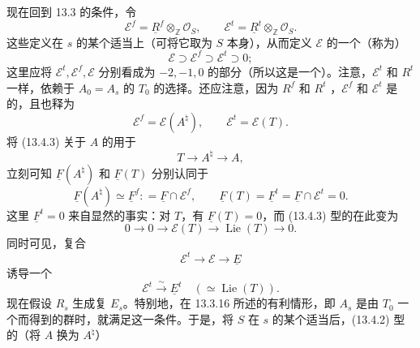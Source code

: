 现在回到 13.3 的条件，令
\begin{equation}
 \mathscr E^f=\underline R^f\otimes_{\mathbb Z}\mathcal O_S,\qquad
 \mathscr E^t=\underline R^t\otimes_{\mathbb Z}\mathcal O_S.
 \tag{13.4.7}
\end{equation}
这些定义在 $s$ 的某个适当上（可将它取为 $S$ 本身），从而定义 $\mathscr E$ 的一个（称为）
\begin{equation}
 \mathscr E\supset\mathscr E^f\supset\mathscr E^t\supset0;
 \tag{13.4.8}
\end{equation}
这里应将 $\mathscr E^t,\mathscr E^f,\mathscr E$ 分别看成为 $-2,-1,0$ 的部分（所以这是一个）。注意，$\mathscr E^t$ 和 $R^t$ 一样，依赖于 $A_0=A_s$ 的 $T_0$ 的选择。还应注意，因为 $R^f$ 和 $R^t$ ，$\mathscr E^f$ 和 $\mathscr E^t$ 是的，且也释为
\begin{equation}
 \mathscr E^f=\mathscr E(A^\natural),\qquad
 \mathscr E^t=\mathscr E(T).
 \tag{13.4.9}
\end{equation}
将 (13.4.3) 关于 $A$ 的用于
\[
 T\longrightarrow A^\natural\longrightarrow A,
\]
立刻可知 $\underline F(A^\natural)$ 和 $\underline F(T)$ 分别认同于
\begin{equation}
 \underline F(A^\natural)\simeq\underline F^f
 \mathrel{\mathop:}=\underline F\cap\mathscr E^f,
 \qquad
 \underline F(T)=\underline F^t=\underline F\cap\mathscr E^t=0.
 \tag{13.4.10}
\end{equation}
这里 $\underline F^t=0$ 来自显然的事实：对 $T$，有 $\underline F(T)=0$，而 (13.4.3) 型的在此变为
\[
 0\longrightarrow0\longrightarrow\mathscr E(T)\longrightarrow\operatorname{Lie}(T)\longrightarrow0.
\]
同时可见，复合
\[
 \mathscr E^t\longrightarrow\mathscr E\longrightarrow\underline E
\]
诱导一个
\begin{equation}
 \mathscr E^t\xrightarrow{\sim}\underline E^t\quad(\simeq\operatorname{Lie}(T)).
 \tag{13.4.11}
\end{equation}
现在假设 $R_s$ 生成复 $E_s$。特别地，在 13.3.16 所述的有利情形，即 $A_s$ 是由 $T_0$ 一个而得到的群时，就满足这一条件。于是，将 $S$ 在 $s$ 的某个适当后，(13.4.2) 型的（将 $A$ 换为 $A^\natural$）
